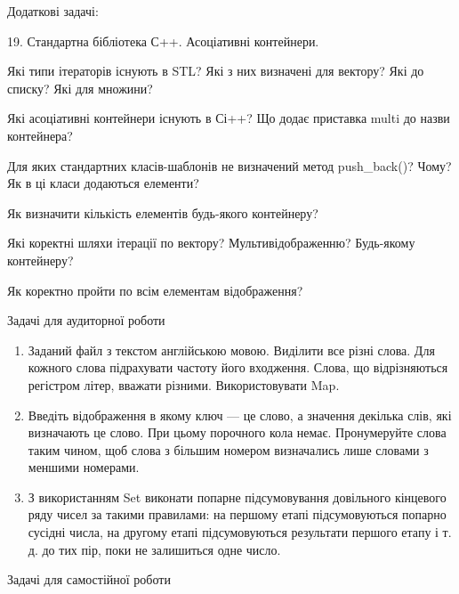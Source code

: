 \documentclass[]{article}
\begin{document}
Додаткові задачі:

19. Стандартна бібліотека С++. Асоціативні контейнери.

Які типи ітераторів існують в STL? Які з них визначені для вектору? Які
до списку? Які для множини?

Які асоціативні контейнери існують в Сі++? Що додає приставка multi до
назви контейнера?

Для яких стандартних класів-шаблонів не визначений метод push\_back()?
Чому? Як в ці класи додаються елементи?

Як визначити кількість елементів будь-якого контейнеру?

Які коректні шляхи ітерації по вектору? Мультивідображенню? Будь-якому
контейнеру?

Як коректно пройти по всім елементам відображення?

Задачі для аудиторної роботи

\begin{enumerate}
\def\labelenumi{\arabic{enumi})}
\item
  Заданий файл з текстом англійською мовою. Виділити все різні слова.
  Для кожного слова підрахувати частоту його входження. Слова, що
  відрізняються регістром літер, вважати різними. Використовувати Map.
\item
  Введіть відображення в якому ключ --- це слово, а значення декілька
  слів, які визначають це слово. При цьому порочного кола немає.
  Пронумеруйте слова таким чином, щоб слова з більшим номером
  визначались лише словами з меншими номерами.
\item
  З використанням Set виконати попарне підсумовування довільного
  кінцевого ряду чисел за такими правилами: на першому етапі
  підсумовуються попарно сусідні числа, на другому етапі підсумовуються
  результати першого етапу і т. д. до тих пір, поки не залишиться одне
  число.
\end{enumerate}

Задачі для самостійної роботи
\end{document}
